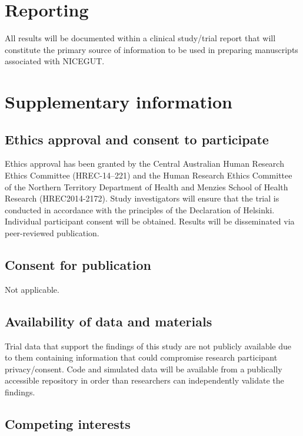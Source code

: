 \documentclass[a4paper]{article}
\begin{document}
\section{Reporting}

All results will be documented within a clinical study/trial report \cite{fda1996} that will constitute the primary source of information to be used in preparing manuscripts associated with NICEGUT.

\section{Supplementary information}

\subsection{Ethics approval and consent to participate}

Ethics approval has been granted by the Central Australian Human Research Ethics Committee (HREC-14–221) and the Human Research Ethics Committee of the Northern Territory Department of Health and Menzies School of Health Research (HREC2014-2172).
Study investigators will ensure that the trial is conducted in accordance with the principles of the Declaration of Helsinki.
Individual participant consent will be obtained.
Results will be disseminated via peer-reviewed publication.

\subsection{Consent for publication}

Not applicable.

\subsection{Availability of data and materials}

Trial data that support the findings of this study are not publicly available due to them containing information that could compromise research participant privacy/consent.
Code and simulated data will be available from a publically accessible repository in order than researchers can independently validate the findings.

\subsection{Competing interests} 
\end{document}
